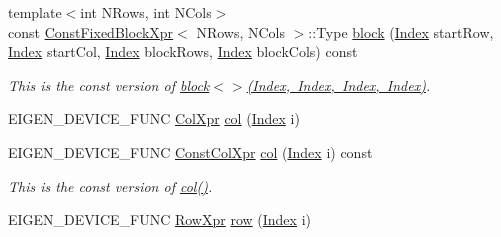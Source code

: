 \begin{DoxyCompactItemize}
\item 
\mbox{\label{class_eigen_1_1_sparse_matrix_base_a928c458f6cd7b169a80691bd01ad3d9a}} 
{\footnotesize template$<$int N\+Rows, int N\+Cols$>$ }\\const \mbox{\hyperlink{struct_eigen_1_1_sparse_matrix_base_1_1_const_fixed_block_xpr}{Const\+Fixed\+Block\+Xpr}}$<$ N\+Rows, N\+Cols $>$\+::Type \mbox{\hyperlink{class_eigen_1_1_sparse_matrix_base_a928c458f6cd7b169a80691bd01ad3d9a}{block}} (\mbox{\hyperlink{struct_eigen_1_1_eigen_base_a554f30542cc2316add4b1ea0a492ff02}{Index}} start\+Row, \mbox{\hyperlink{struct_eigen_1_1_eigen_base_a554f30542cc2316add4b1ea0a492ff02}{Index}} start\+Col, \mbox{\hyperlink{struct_eigen_1_1_eigen_base_a554f30542cc2316add4b1ea0a492ff02}{Index}} block\+Rows, \mbox{\hyperlink{struct_eigen_1_1_eigen_base_a554f30542cc2316add4b1ea0a492ff02}{Index}} block\+Cols) const
\begin{DoxyCompactList}\small\item\em This is the const version of \mbox{\hyperlink{class_eigen_1_1_sparse_matrix_base_a7c28a2f511181c727396d5e813519d38}{block$<$$>$(\+Index, Index, Index, Index)}}. \end{DoxyCompactList}\item 
E\+I\+G\+E\+N\+\_\+\+D\+E\+V\+I\+C\+E\+\_\+\+F\+U\+NC \mbox{\hyperlink{class_eigen_1_1_block}{Col\+Xpr}} \mbox{\hyperlink{class_eigen_1_1_sparse_matrix_base_a8f4eaa3c3921ef3823ffc69ebcc356af}{col}} (\mbox{\hyperlink{struct_eigen_1_1_eigen_base_a554f30542cc2316add4b1ea0a492ff02}{Index}} i)
\item 
\mbox{\label{class_eigen_1_1_sparse_matrix_base_a2659a9d172199e1963ce27756c25390c}} 
E\+I\+G\+E\+N\+\_\+\+D\+E\+V\+I\+C\+E\+\_\+\+F\+U\+NC \mbox{\hyperlink{class_eigen_1_1_block}{Const\+Col\+Xpr}} \mbox{\hyperlink{class_eigen_1_1_sparse_matrix_base_a2659a9d172199e1963ce27756c25390c}{col}} (\mbox{\hyperlink{struct_eigen_1_1_eigen_base_a554f30542cc2316add4b1ea0a492ff02}{Index}} i) const
\begin{DoxyCompactList}\small\item\em This is the const version of \mbox{\hyperlink{class_eigen_1_1_sparse_matrix_base_a8f4eaa3c3921ef3823ffc69ebcc356af}{col()}}. \end{DoxyCompactList}\item 
E\+I\+G\+E\+N\+\_\+\+D\+E\+V\+I\+C\+E\+\_\+\+F\+U\+NC \mbox{\hyperlink{class_eigen_1_1_block}{Row\+Xpr}} \mbox{\hyperlink{class_eigen_1_1_sparse_matrix_base_ac0a5563ed3f243f013fb9d2c17e230d0}{row}} (\mbox{\hyperlink{struct_eigen_1_1_eigen_base_a554f30542cc2316add4b1ea0a492ff02}{Index}} i)

\end{DoxyCompactItemize}
